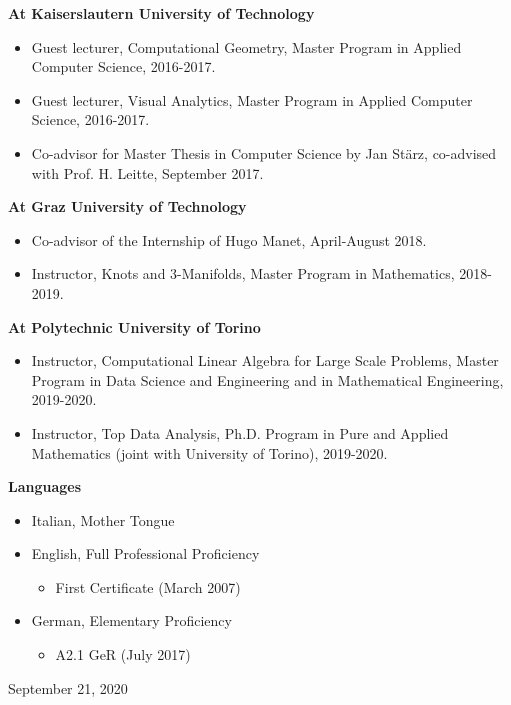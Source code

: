 \documentclass[11pt]{article}
\begin{document}
\vspace*{1ex}
\noindent
{\bf At Kaiserslautern University of Technology}

\begin{itemize}
  \item Guest lecturer, Computational Geometry, Master Program in Applied Computer Science, 2016-2017.
  \item Guest lecturer, Visual Analytics, Master Program in Applied Computer Science, 2016-2017.
  \item Co-advisor for Master Thesis in Computer Science by Jan St\"{a}rz, co-advised with Prof. H. Leitte, September 2017.
\end{itemize}

\vspace*{1ex}
\noindent
{\bf At Graz University of Technology}

\begin{itemize}
  \item Co-advisor of the Internship of Hugo Manet, April-August 2018.
  \item Instructor, Knots and 3-Manifolds, Master Program in Mathematics, 2018-2019.
\end{itemize}

\vspace*{1ex}
\noindent
{\bf At Polytechnic University of Torino}

\begin{itemize}
  \item Instructor, Computational Linear Algebra for Large Scale Problems, Master Program in Data Science and Engineering and in Mathematical Engineering, 2019-2020.
  \item Instructor, Top Data Analysis, Ph.D. Program in Pure and Applied Mathematics (joint with University of Torino), 2019-2020.
\end{itemize}


\vspace*{2.5ex}
\noindent
{\Large\bf Languages}

\begin{itemize}
\item Italian, Mother Tongue
\item English, Full Professional Proficiency
\begin{itemize}
  \item First Certificate (March 2007)
\end{itemize}
\item German, Elementary Proficiency
\begin{itemize}
  \item A2.1 GeR (July 2017)
\end{itemize}
\end{itemize}


\vspace*{8ex}
\noindent
September 21, 2020

\end{document}
